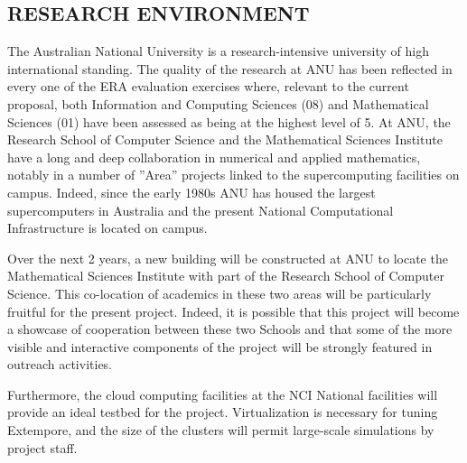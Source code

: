 \subsection*{RESEARCH ENVIRONMENT}

The Australian National University is a research-intensive university
of high international standing. The quality of the research at ANU has
been reflected in every one of the ERA evaluation exercises where,
relevant to the current proposal, both Information and Computing
Sciences (08) and Mathematical Sciences (01) have been assessed as
being at the highest level of 5. At ANU, the Research School of
Computer Science and the Mathematical Sciences Institute have a long
and deep collaboration in numerical and applied mathematics, notably
in a number of ''Area'' projects linked to the supercomputing
facilities on campus. Indeed, since the early 1980s ANU has housed the
largest supercomputers in Australia and the present National
Computational Infrastructure is located on campus.

Over the next 2 years, a new building will be constructed at ANU to
locate the Mathematical Sciences Institute with part of the Research
School of Computer Science. This co-location of academics in these two
areas will be particularly fruitful for the present project. Indeed,
it is possible that this project will become a showcase of cooperation
between these two Schools and that some of the more visible and
interactive components of the project will be strongly featured in
outreach activities.

Furthermore, the cloud computing facilities at the NCI National
facilities will provide an ideal testbed for the
project. Virtualization is necessary for tuning Extempore, and the
size of the clusters will permit large-scale simulations by project
staff.
